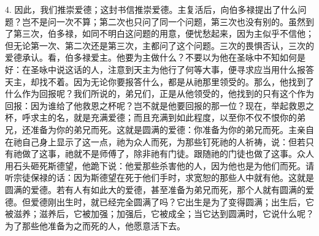 4. 因此，我们推崇爱德；这封书信推崇爱德。主复活后，向伯多禄提出了什么问题？岂不是问一次不算；第二次也只问了同一个问题，第三次也没有别的。虽然到了第三次，伯多禄，如同不明白这问题的用意，便忧愁起来，因为主似乎不信他；但无论第一次、第二次还是第三次，主都问了这个问题。三次的畏惧否认，三次的爱德承认。看，伯多禄爱主。他要为主做什么？不要以为他在圣咏中不知如何是好：在圣咏中说这话的人，注意到天主为他行了何等大事，便寻求应当用什么报答天主，却找不着。因为无论你要报答什么，都是从祂那里领受的。那么，他找到了什么作为回报呢？我们所说的，弟兄们，正是从他领受的，他找到的只有这个作为回报：因为谁给了他救恩之杯呢？岂不就是他要回报的那一位？现在，举起救恩之杯，呼求主的名，就是充满爱德；而且充满到如此程度，以至你不仅不恨你的弟兄，还准备为你的弟兄而死。这就是圆满的爱德：你准备为你的弟兄而死。主亲自在祂自己身上显示了这一点，祂为众人而死，为那些钉死祂的人祈祷，说：但若只有祂做了这事，祂就不是师傅了，除非祂有门徒。跟随祂的门徒也做了这事。众人用石头砸死斯德望，他跪下说：他爱那些杀害他的人，因为他也是为他们而死。请听宗徒保禄的话：因为斯德望在死于他们手时，求宽恕的那些人中就有他。这就是圆满的爱德。若有人有如此大的爱德，甚至准备为弟兄而死，那个人就有圆满的爱德。但爱德刚出生时，就已经完全圆满了吗？它出生是为了变得圆满；出生后，它被滋养；滋养后，它被加强；加强后，它被成全；当它达到圆满时，它说什么呢？为了那些他准备为之而死的人，他愿意活下去。\par

